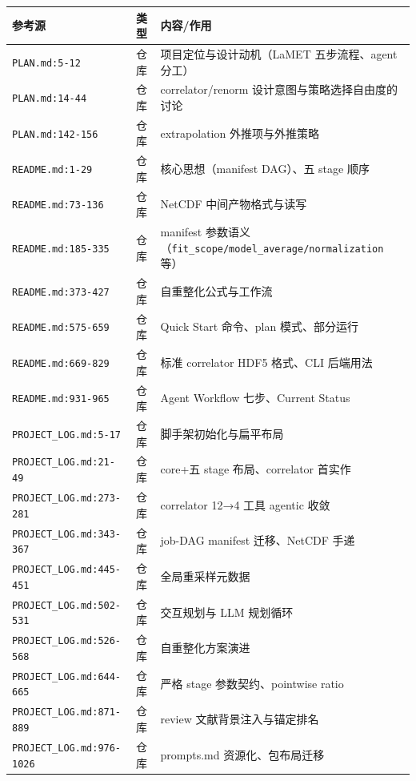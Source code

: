 \documentclass[UTF8]{ctexart}
\begin{document}
\begin{xltabular}{\textwidth}{llX}
\toprule
\textcolor{evidence}{参考源} & 类型 & 内容/作用 \\
\midrule
\endhead
\texttt{\nolinkurl{PLAN.md:5-12}} & 仓库 & 项目定位与设计动机（LaMET 五步流程、agent 分工）\\
\texttt{\nolinkurl{PLAN.md:14-44}} & 仓库 & correlator/renorm 设计意图与策略选择自由度的讨论\\
\texttt{\nolinkurl{PLAN.md:142-156}} & 仓库 & extrapolation 外推项与外推策略\\
\texttt{\nolinkurl{README.md:1-29}} & 仓库 & 核心思想（manifest DAG）、五 stage 顺序\\
\texttt{\nolinkurl{README.md:73-136}} & 仓库 & NetCDF 中间产物格式与读写\\
\texttt{\nolinkurl{README.md:185-335}} & 仓库 & manifest 参数语义（\texttt{\nolinkurl{fit_scope/model_average/normalization}} 等）\\
\texttt{\nolinkurl{README.md:373-427}} & 仓库 & 自重整化公式与工作流\\
\texttt{\nolinkurl{README.md:575-659}} & 仓库 & Quick Start 命令、plan 模式、部分运行\\
\texttt{\nolinkurl{README.md:669-829}} & 仓库 & 标准 correlator HDF5 格式、CLI 后端用法\\
\texttt{\nolinkurl{README.md:931-965}} & 仓库 & Agent Workflow 七步、Current Status\\
\texttt{\nolinkurl{PROJECT_LOG.md:5-17}} & 仓库 & 脚手架初始化与扁平布局\\
\texttt{\nolinkurl{PROJECT_LOG.md:21-49}} & 仓库 & core+五 stage 布局、correlator 首实作\\
\texttt{\nolinkurl{PROJECT_LOG.md:273-281}} & 仓库 & correlator 12→4 工具 agentic 收敛\\
\texttt{\nolinkurl{PROJECT_LOG.md:343-367}} & 仓库 & job-DAG manifest 迁移、NetCDF 手递\\
\texttt{\nolinkurl{PROJECT_LOG.md:445-451}} & 仓库 & 全局重采样元数据\\
\texttt{\nolinkurl{PROJECT_LOG.md:502-531}} & 仓库 & 交互规划与 LLM 规划循环\\
\texttt{\nolinkurl{PROJECT_LOG.md:526-568}} & 仓库 & 自重整化方案演进\\
\texttt{\nolinkurl{PROJECT_LOG.md:644-665}} & 仓库 & 严格 stage 参数契约、pointwise ratio\\
\texttt{\nolinkurl{PROJECT_LOG.md:871-889}} & 仓库 & review 文献背景注入与锚定排名\\
\texttt{\nolinkurl{PROJECT_LOG.md:976-1026}} & 仓库 & prompts.md 资源化、包布局迁移\\

\end{xltabular}
\end{document}
